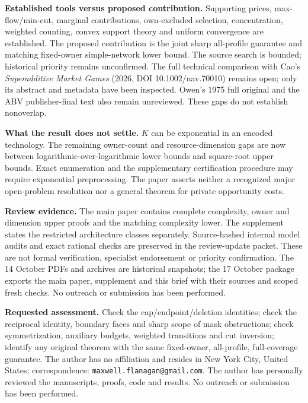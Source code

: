 \documentclass[11pt]{article}
\begin{document}
\textbf{Established tools versus proposed contribution.} Supporting prices,
max-flow/min-cut, marginal contributions, own-excluded selection,
concentration, weighted counting, convex support theory and uniform
convergence are established. The proposed contribution is the joint sharp
all-profile guarantee and matching fixed-owner simple-network lower bound.
The source search is bounded; historical priority remains unconfirmed.
The full technical comparison with Cao's \emph{Superadditive Market Games}
(2026, DOI 10.1002/nav.70010) remains open; only its abstract and metadata
have been inspected. Owen's 1975 full original and the ABV publisher-final
text also remain unreviewed. These gaps do not establish nonoverlap.

\textbf{What the result does not settle.} $K$ can be exponential in an encoded
technology. The remaining owner-count and resource-dimension gaps are now between logarithmic-over-logarithmic lower bounds and square-root upper bounds.
Exact enumeration and the supplementary certification procedure may require
exponential preprocessing. The paper asserts neither a recognized major
open-problem resolution nor a general theorem for private opportunity costs.

\textbf{Review evidence.} The main paper contains complete complexity, owner
and dimension upper proofs and the matching complexity lower. The supplement
states the restricted architecture classes separately. Source-hashed internal
model audits and exact rational checks are preserved in the review-update
packet. These are not formal verification, specialist endorsement or priority
confirmation. The 14 October PDFs and archives are historical snapshots;
the 17 October package exports the main paper, supplement and this brief
with their sources and scoped fresh checks. No outreach or submission has been performed.

\textbf{Requested assessment.} Check the cap/endpoint/deletion identities;
check the reciprocal identity, boundary faces and sharp scope of mask obstructions;
check symmetrization, auxiliary budgets, weighted transitions and cut inversion;
identify any original theorem with the same fixed-owner, all-profile,
full-coverage guarantee. The author has no affiliation and resides in
New York City, United States; correspondence: \texttt{maxwell.flanagan@gmail.com}.
The author has personally reviewed the manuscripts, proofs, code and results.
No outreach or submission has been performed.
\end{document}
